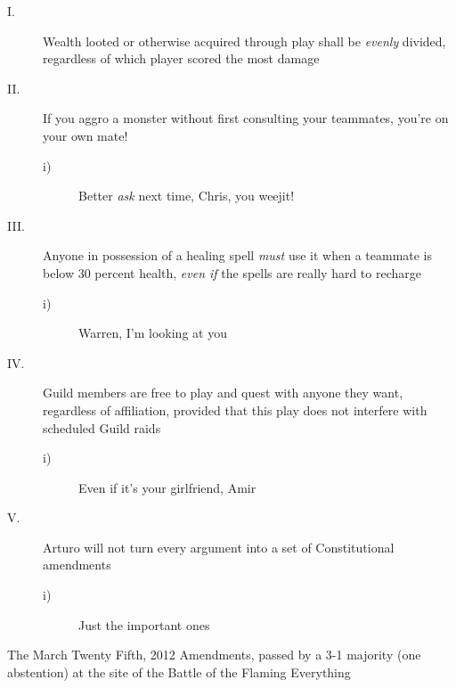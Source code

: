 \begin{description}
\item[I.] Wealth looted or otherwise acquired through play shall be 
\emph{evenly} divided, regardless of which player scored the most damage

\item[II.] If you aggro a monster without first consulting your teammates, 
you're on your own mate!

\begin{description}
\item[i)] Better \emph{ask} next time, Chris, you 
weejit! 
\end{description}

\item[III.] Anyone in possession of a healing spell \emph{must} use it when a 
teammate is below 30 percent health, \emph{even if} the spells are 
really hard to recharge

\begin{description}
\item[i)] Warren, I'm looking at you 

\end{description}

\item[IV.] Guild members are free to play and quest with anyone they want, 
regardless of affiliation, provided that this play does not interfere 
with scheduled Guild raids

\begin{description}
\item[i)] Even if it's your girlfriend, Amir 

\end{description}

\item[V.] Arturo will not turn every argument into a set of Constitutional 
amendments

\begin{description}
\item[i)] Just the important ones 

\end{description}
\end{description}

\tb

The March Twenty Fifth, 2012 Amendments, passed by a 3-1 majority (one 
abstention) at the site of the Battle of the Flaming Everything

